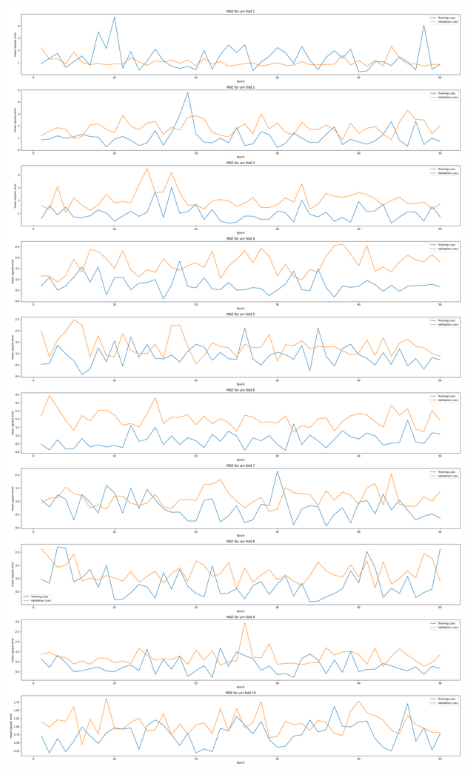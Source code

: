 \documentclass[11pt, a4paper]{article}
\begin{document}
    \begin{center}
        \includegraphics[width=0.9\textwidth]{GAT_folds10errors.png}
    \end{center}
\end{document}

